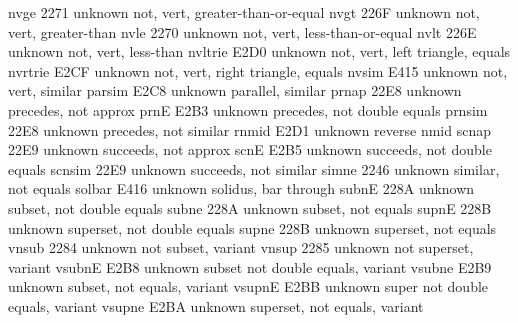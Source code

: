  nvge                    2271 {unknown} not, vert, greater-than-or-equal
 nvgt                    226F {unknown} not, vert, greater-than
 nvle                    2270 {unknown} not, vert, less-than-or-equal
 nvlt                    226E {unknown} not, vert, less-than
 nvltrie                 E2D0 {unknown} not, vert, left triangle, equals
 nvrtrie                 E2CF {unknown} not, vert, right triangle, equals
 nvsim                   E415 {unknown} not, vert, similar
 parsim                  E2C8 {unknown} parallel, similar
 prnap                   22E8 {unknown} precedes, not approx
 prnE                    E2B3 {unknown} precedes, not double equals
 prnsim                  22E8 {unknown} precedes, not similar
 rnmid                   E2D1 {unknown} reverse nmid
 scnap                   22E9 {unknown} succeeds, not approx
 scnE                    E2B5 {unknown} succeeds, not double equals
 scnsim                  22E9 {unknown} succeeds, not similar
 simne                   2246 {unknown} similar, not equals
 solbar                  E416 {unknown} solidus, bar through
 subnE                   228A {unknown} subset, not double equals
 subne                   228A {unknown} subset, not equals
 supnE                   228B {unknown} superset, not double equals
 supne                   228B {unknown} superset, not equals
 vnsub                   2284 {unknown} not subset, variant
 vnsup                   2285 {unknown} not superset, variant
 vsubnE                  E2B8 {unknown} subset not double equals, variant
 vsubne                  E2B9 {unknown} subset, not equals, variant
 vsupnE                  E2BB {unknown} super not double equals, variant
 vsupne                  E2BA {unknown} superset, not equals, variant
